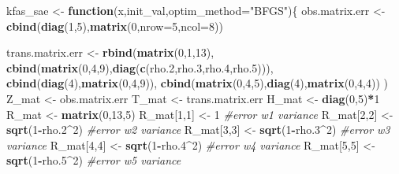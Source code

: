 \documentclass[]{article}
\newenvironment{Shaded}{\begin{snugshade}}{\end{snugshade}}
\newcommand{\KeywordTok}[1]{\textcolor[rgb]{0.13,0.29,0.53}{\textbf{#1}}}
\newcommand{\DataTypeTok}[1]{\textcolor[rgb]{0.13,0.29,0.53}{#1}}
\newcommand{\DecValTok}[1]{\textcolor[rgb]{0.00,0.00,0.81}{#1}}
\newcommand{\StringTok}[1]{\textcolor[rgb]{0.31,0.60,0.02}{#1}}
\newcommand{\CommentTok}[1]{\textcolor[rgb]{0.56,0.35,0.01}{\textit{#1}}}
\newcommand{\ControlFlowTok}[1]{\textcolor[rgb]{0.13,0.29,0.53}{\textbf{#1}}}
\newcommand{\OperatorTok}[1]{\textcolor[rgb]{0.81,0.36,0.00}{\textbf{#1}}}
\newcommand{\NormalTok}[1]{#1}
\begin{document}
\begin{Shaded}
\begin{Highlighting}[]
   
\NormalTok{kfas_sae <-}\StringTok{ }\ControlFlowTok{function}\NormalTok{(x,init_val,}\DataTypeTok{optim_method=}\StringTok{"BFGS"}\NormalTok{)\{}
\NormalTok{  obs.matrix.err <-}\StringTok{ }\KeywordTok{cbind}\NormalTok{(}\KeywordTok{diag}\NormalTok{(}\DecValTok{1}\NormalTok{,}\DecValTok{5}\NormalTok{),}\KeywordTok{matrix}\NormalTok{(}\DecValTok{0}\NormalTok{,}\DataTypeTok{nrow=}\DecValTok{5}\NormalTok{,}\DataTypeTok{ncol=}\DecValTok{8}\NormalTok{))}

\NormalTok{  trans.matrix.err <-}\StringTok{ }\KeywordTok{rbind}\NormalTok{(}\KeywordTok{matrix}\NormalTok{(}\DecValTok{0}\NormalTok{,}\DecValTok{1}\NormalTok{,}\DecValTok{13}\NormalTok{),}
          \KeywordTok{cbind}\NormalTok{(}\KeywordTok{matrix}\NormalTok{(}\DecValTok{0}\NormalTok{,}\DecValTok{4}\NormalTok{,}\DecValTok{9}\NormalTok{),}\KeywordTok{diag}\NormalTok{(}\KeywordTok{c}\NormalTok{(rho.}\DecValTok{2}\NormalTok{,rho.}\DecValTok{3}\NormalTok{,rho.}\DecValTok{4}\NormalTok{,rho.}\DecValTok{5}\NormalTok{))),}
          \KeywordTok{cbind}\NormalTok{(}\KeywordTok{diag}\NormalTok{(}\DecValTok{4}\NormalTok{),}\KeywordTok{matrix}\NormalTok{(}\DecValTok{0}\NormalTok{,}\DecValTok{4}\NormalTok{,}\DecValTok{9}\NormalTok{)),}
          \KeywordTok{cbind}\NormalTok{(}\KeywordTok{matrix}\NormalTok{(}\DecValTok{0}\NormalTok{,}\DecValTok{4}\NormalTok{,}\DecValTok{5}\NormalTok{),}\KeywordTok{diag}\NormalTok{(}\DecValTok{4}\NormalTok{),}\KeywordTok{matrix}\NormalTok{(}\DecValTok{0}\NormalTok{,}\DecValTok{4}\NormalTok{,}\DecValTok{4}\NormalTok{))}
\NormalTok{    )}
\NormalTok{   Z_mat <-}\StringTok{ }\NormalTok{obs.matrix.err}
\NormalTok{   T_mat <-}\StringTok{ }\NormalTok{trans.matrix.err}
\NormalTok{   H_mat <-}\StringTok{ }\KeywordTok{diag}\NormalTok{(}\DecValTok{0}\NormalTok{,}\DecValTok{5}\NormalTok{)}\OperatorTok{*}\DecValTok{1}
\NormalTok{   R_mat <-}\StringTok{ }\KeywordTok{matrix}\NormalTok{(}\DecValTok{0}\NormalTok{,}\DecValTok{13}\NormalTok{,}\DecValTok{5}\NormalTok{)}
\NormalTok{   R_mat[}\DecValTok{1}\NormalTok{,}\DecValTok{1}\NormalTok{] <-}\StringTok{ }\DecValTok{1}  \CommentTok{#error w1 variance}
\NormalTok{   R_mat[}\DecValTok{2}\NormalTok{,}\DecValTok{2}\NormalTok{] <-}\StringTok{ }\KeywordTok{sqrt}\NormalTok{(}\DecValTok{1}\OperatorTok{-}\NormalTok{rho.}\DecValTok{2}\OperatorTok{^}\DecValTok{2}\NormalTok{)  }\CommentTok{#error w2 variance}
\NormalTok{   R_mat[}\DecValTok{3}\NormalTok{,}\DecValTok{3}\NormalTok{] <-}\StringTok{ }\KeywordTok{sqrt}\NormalTok{(}\DecValTok{1}\OperatorTok{-}\NormalTok{rho.}\DecValTok{3}\OperatorTok{^}\DecValTok{2}\NormalTok{)  }\CommentTok{#error w3 variance}
\NormalTok{   R_mat[}\DecValTok{4}\NormalTok{,}\DecValTok{4}\NormalTok{] <-}\StringTok{ }\KeywordTok{sqrt}\NormalTok{(}\DecValTok{1}\OperatorTok{-}\NormalTok{rho.}\DecValTok{4}\OperatorTok{^}\DecValTok{2}\NormalTok{)  }\CommentTok{#error w4 variance}
\NormalTok{   R_mat[}\DecValTok{5}\NormalTok{,}\DecValTok{5}\NormalTok{] <-}\StringTok{ }\KeywordTok{sqrt}\NormalTok{(}\DecValTok{1}\OperatorTok{-}\NormalTok{rho.}\DecValTok{5}\OperatorTok{^}\DecValTok{2}\NormalTok{)  }\CommentTok{#error w5 variance }


\end{Highlighting}
\end{Shaded}
\end{document}
